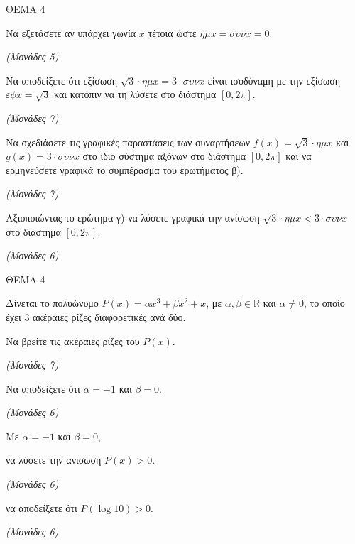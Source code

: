 \documentclass[11pt,a4paper,twoside]{book}
\newcommand{\monades}[1]{\hfill \textit{(Μονάδες #1)}}
\begin{document}
ΘΕΜΑ 4

\begin{alist}
\item Να εξετάσετε αν υπάρχει γωνία $x$ τέτοια ώστε $\eta\mu x = \sigma\upsilon\nu x = 0$.

\monades{5}

\item Να αποδείξετε ότι εξίσωση $\sqrt{3} \cdot \eta\mu x = 3 \cdot \sigma\upsilon\nu x$ είναι ισοδύναμη με την εξίσωση $\varepsilon\phi x = \sqrt{3}$ και κατόπιν να τη λύσετε στο διάστημα $[0, 2\pi]$.

\monades{7}

\item Να σχεδιάσετε τις γραφικές παραστάσεις των συναρτήσεων $f(x) = \sqrt{3} \cdot \eta\mu x$ και $g(x) = 3 \cdot \sigma\upsilon\nu x$ στο ίδιο σύστημα αξόνων στο διάστημα $[0, 2\pi]$ και να ερμηνεύσετε γραφικά το συμπέρασμα του ερωτήματος β).

\monades{7}

\item Αξιοποιώντας το ερώτημα γ) να λύσετε γραφικά την ανίσωση $\sqrt{3} \cdot \eta\mu x < 3 \cdot \sigma\upsilon\nu x$ στο διάστημα $[0, 2\pi]$.

\monades{6}
\end{alist}

\vspace{4mm}

ΘΕΜΑ 4

Δίνεται το πολυώνυμο $P(x) = \alpha x^3 + \beta x^2 + x$, με $\alpha, \beta \in \mathbb{R}$ και $\alpha \neq 0$, το οποίο έχει 3 ακέραιες ρίζες διαφορετικές ανά δύο.

\begin{alist}
\item Να βρείτε τις ακέραιες ρίζες του $P(x)$.

\monades{7}

\item Να αποδείξετε ότι $\alpha = -1$ και $\beta = 0$.

\monades{6}

\item Με $\alpha = -1$ και $\beta = 0$,

\begin{rlist}
\item να λύσετε την ανίσωση $P(x) > 0$.

\monades{6}

\item να αποδείξετε ότι $P(\log 10) > 0$.

\monades{6}
\end{rlist}
\end{alist}
\end{document}
